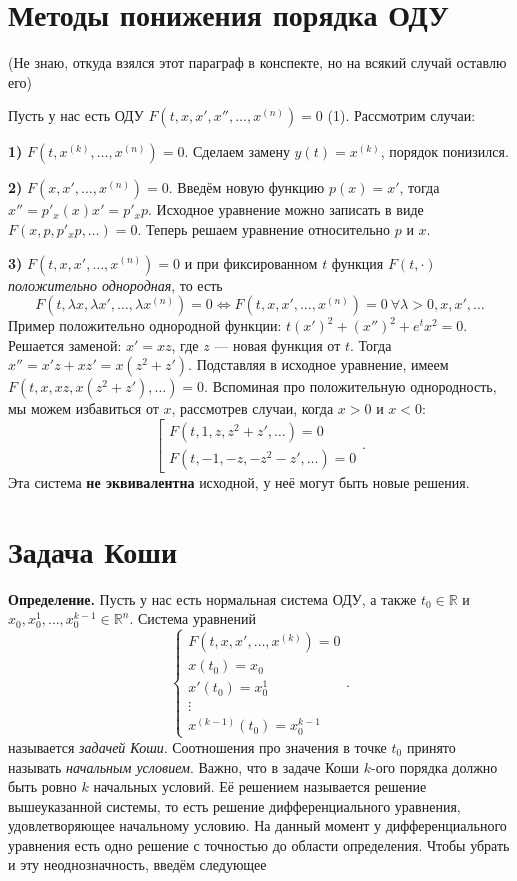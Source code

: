 \QED

\section{Методы понижения порядка ОДУ}
(Не знаю, откуда взялся этот параграф в конспекте, но на всякий случай оставлю его)

Пусть у нас есть ОДУ $F(t, x, x', x'', \dots, x^{(n)}) = 0$ (1). Рассмотрим случаи:

\textbf{1)} $F(t, x^{(k)}, \dots, x^{(n)}) = 0$. Сделаем замену $y(t) = x^{(k)}$, порядок понизился.

\textbf{2)} $F(x, x', \dots, x^{(n)}) = 0$. Введём новую функцию $p(x) = x'$, тогда $x'' = p'_x(x) x' = p'_x p$.
Исходное уравнение можно записать в виде $F(x, p, p'_xp, \dots) = 0$. Теперь решаем уравнение относительно $p$ и $x$.

\textbf{3)} $F(t, x, x', \dots, x^{(n)}) = 0$ и при фиксированном $t$ функция $F(t, \cdot)$ \textit{положительно однородная}, то есть
\[
    F(t, \lambda x, \lambda x', \dots, \lambda x^{(n)}) = 0 \iff F(t, x, x', \dots, x^{(n)}) = 0~\forall \lambda > 0, x, x', \dots
\]
Пример положительно однородной функции: $t(x')^2 + (x'')^2 + e^tx^2 = 0$.
Решается заменой: $x' = xz$, где $z$ --- новая функция от $t$. Тогда $x'' = x'z + xz' = x(z^2 + z')$.
Подставляя в исходное уравнение, имеем $F(t, x, xz, x(z^2 + z'), \dots) = 0$.
Вспоминая про положительную однородность, мы можем избавиться от $x$, рассмотрев случаи, когда $x > 0$ и $x < 0$:
\[
    \left[
        \begin{array}{ll}
            F(t, 1, z, z^2 + z', \dots) = 0 \\
            F(t, -1, -z, -z^2 - z', \dots) = 0
        \end{array}
    \right ..
\]
Эта система \textbf{не эквивалентна} исходной, у неё могут быть новые решения.

\section{Задача Коши}
\textbf{Определение.} Пусть у нас есть нормальная система ОДУ, а также $t_0 \in \mathbb R$ и $x_0, x_0^1, \dots, x_0^{k-1} \in \mathbb R^n$. Система уравнений
\[
    \begin{cases}
        F(t, x, x', \dots, x^{(k)}) = 0 \\
        x(t_0) = x_0 \\
        x'(t_0) = x_0^1 \\
        \vdots \\
        x^{(k-1)}(t_0) = x_0^{k-1}
    \end{cases} .
\]
называется \textit{задачей Коши}.
Соотношения про значения в точке $t_0$ принято называть \textit{начальным условием}. 
Важно, что в задаче Коши $k$-ого порядка должно быть ровно $k$ начальных условий.
Её решением называется решение вышеуказанной системы, то есть решение дифференциального уравнения, удовлетворяющее начальному условию.
На данный момент у дифференциального уравнения есть одно решение с точностью до области определения. Чтобы убрать и эту неоднозначность, введём следующее

